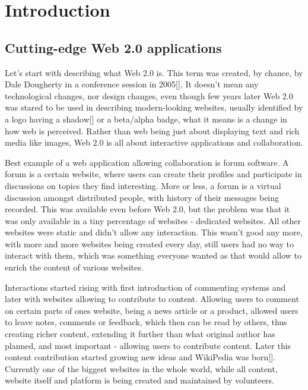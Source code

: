 \chapter{Introduction}



\section{Cutting-edge Web 2.0 applications}

Let's start with describing what Web 2.0 is. This term was created, by chance, by Dale Dougherty in a conference session in 2005[]. It doesn't mean any technological changes, nor design changes, even though few years later Web 2.0 was stared to be used in describing modern-looking websites, usually identified by a logo having a shadow[] or a beta/alpha badge, what it means is a change in how web is perceived. Rather than web being just about displaying text and rich media like images, Web 2.0 is all about interactive applications and collaboration. 

Best example of a web application allowing collaboration is forum software. A forum is a certain website, where users can create their profiles and participate in discussions on topics they find interesting. More or less, a forum is a virtual discussion amongst distributed people, with history of their messages being recorded. This was available even before Web 2.0, but the problem was that it was only available in a tiny percentage of websites - dedicated websites. All other websites were static and didn't allow any interaction. This wasn't good any more, with more and more websites being created every day, still users had no way to interact with them, which was something everyone wanted as that would allow to enrich the content of various websites. 

Interactions started rising with first introduction of commenting systems and later with websites allowing to contribute to content. Allowing users to comment on certain parts of ones website, being a news article or a product, allowed users to leave notes, comments or feedback, which then can be read by others, thus creating richer content, extending it further than what original author has planned, and most important - allowing users to contribute content. Later this content contribution started growing new ideas and WikiPedia was born[]. Currently one of the biggest websites in the whole world, while all content, website itself and platform is being created and maintained by volunteers. 

